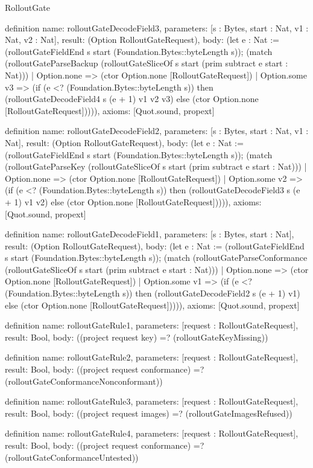 \begin{lexlean}{RolloutGate}
\begin{semanticmodule}
definition{
  name: rolloutGateDecodeField3,
  parameters: [s : Bytes, start : Nat, v1 : Nat, v2 : Nat],
  result: (Option RolloutGateRequest),
  body: (let e : Nat := (rolloutGateFieldEnd s start (Foundation.Bytes::byteLength s)); (match (rolloutGateParseBackup (rolloutGateSliceOf s start (prim subtract e start : Nat)))
    | Option.none => (ctor Option.none [RolloutGateRequest])
    | Option.some v3 => (if (e <? (Foundation.Bytes::byteLength s)) then (rolloutGateDecodeField4 s (e + 1) v1 v2 v3) else (ctor Option.none [RolloutGateRequest])))),
  axioms: [Quot.sound, propext]
}

definition{
  name: rolloutGateDecodeField2,
  parameters: [s : Bytes, start : Nat, v1 : Nat],
  result: (Option RolloutGateRequest),
  body: (let e : Nat := (rolloutGateFieldEnd s start (Foundation.Bytes::byteLength s)); (match (rolloutGateParseKey (rolloutGateSliceOf s start (prim subtract e start : Nat)))
    | Option.none => (ctor Option.none [RolloutGateRequest])
    | Option.some v2 => (if (e <? (Foundation.Bytes::byteLength s)) then (rolloutGateDecodeField3 s (e + 1) v1 v2) else (ctor Option.none [RolloutGateRequest])))),
  axioms: [Quot.sound, propext]
}

definition{
  name: rolloutGateDecodeField1,
  parameters: [s : Bytes, start : Nat],
  result: (Option RolloutGateRequest),
  body: (let e : Nat := (rolloutGateFieldEnd s start (Foundation.Bytes::byteLength s)); (match (rolloutGateParseConformance (rolloutGateSliceOf s start (prim subtract e start : Nat)))
    | Option.none => (ctor Option.none [RolloutGateRequest])
    | Option.some v1 => (if (e <? (Foundation.Bytes::byteLength s)) then (rolloutGateDecodeField2 s (e + 1) v1) else (ctor Option.none [RolloutGateRequest])))),
  axioms: [Quot.sound, propext]
}

definition{
  name: rolloutGateRule1,
  parameters: [request : RolloutGateRequest],
  result: Bool,
  body: ((project request key) =? (rolloutGateKeyMissing))
}

definition{
  name: rolloutGateRule2,
  parameters: [request : RolloutGateRequest],
  result: Bool,
  body: ((project request conformance) =? (rolloutGateConformanceNonconformant))
}

definition{
  name: rolloutGateRule3,
  parameters: [request : RolloutGateRequest],
  result: Bool,
  body: ((project request images) =? (rolloutGateImagesRefused))
}

definition{
  name: rolloutGateRule4,
  parameters: [request : RolloutGateRequest],
  result: Bool,
  body: ((project request conformance) =? (rolloutGateConformanceUntested))
}


\end{semanticmodule}
\end{lexlean}
